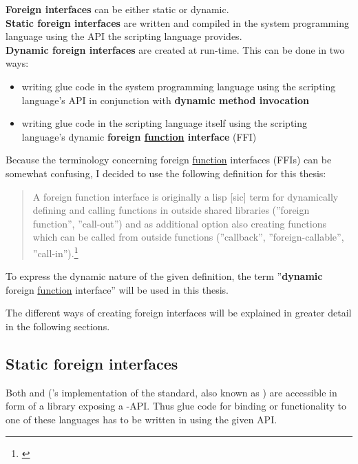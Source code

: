 \textbf{Foreign interfaces} can be either static or dynamic.\\
\textbf{Static foreign interfaces} are written and compiled in the system programming language using the API the scripting language provides.\\
\textbf{Dynamic foreign interfaces} are created at run-time. This can be done in two ways:
\begin{itemize}
\item writing glue code in the system programming language using the scripting language's API in conjunction with \textbf{dynamic method invocation}
\item writing glue code in the scripting language itself using the scripting language's dynamic \textbf{foreign \underline{function} interface} (FFI)
\end{itemize}

Because the terminology concerning foreign \underline{function} interfaces (FFIs) can be somewhat confusing, I decided to use the following definition for this thesis:

\begin{quotation}
A foreign function interface is originally a lisp [sic] term for dynamically defining and calling functions in outside shared libraries (''foreign function'', ''call-out'') and as additional option also creating functions which can be called from outside functions (''callback'', ''foreign-callable'', ''call-in'').\footnote{\citep{DesignFFI}}
\end{quotation}

To express the dynamic nature of the given definition, the term ''\textbf{dynamic} foreign \underline{function} interface'' will be used in this thesis.

The different ways of creating foreign interfaces will be explained in greater detail in the following sections.

\subsection{Static foreign interfaces}

Both  and  ('s implementation of the  standard, also known as ) are accessible in form of a library exposing a -API. Thus glue code for binding  or  functionality to one of these languages has to be written in  using the given API.

